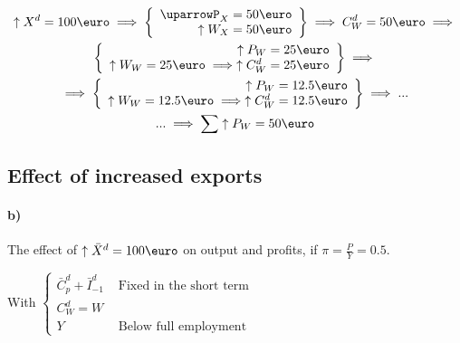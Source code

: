 \documentclass{report}
\begin{document}
\begin{multline*}
    \uparrow X^d=100\text{\euro} \implies \left\{\begin{array}{r}
         \uparrowP_X=50\text{\euro}  \\
         \uparrow W_X=50\text{\euro} 
    \end{array}\right\} \implies C^d_W=50\text{\euro} \implies \\ \left\{\begin{array}{r}
         \uparrow P_W=25\text{\euro}  \\
         \uparrow W_W=25\text{\euro}  \implies \uparrow C^d_W=25\text{\euro} 
    \end{array} \right\} \implies \\ \implies \left\{\begin{array}{r}
          \uparrow P_W=12.5\text{\euro} \\
          \uparrow W_W=12.5\text{\euro}  \implies \uparrow C^d_W=12.5\text{\euro} 
    \end{array}\right\} \implies ... \\ ... \implies 
    \sum \uparrow P_W=50\text{\euro}
\end{multline*}


\subsection{Effect of increased exports}

\paragraph{b)} The effect of $\uparrow \bar{X}^d=100\text{\euro}$ on output and profits, if $\pi=\frac{P}{Y}=0.5$.

With $\left\{\begin{array}{cc}
      \bar{C}^d_p+\bar{I}^d_{-1} & \text{ Fixed in the short term}\\
      C^d_W=W \\
      Y & \text{ Below full employment}
\end{array}\right.$
\end{document}
